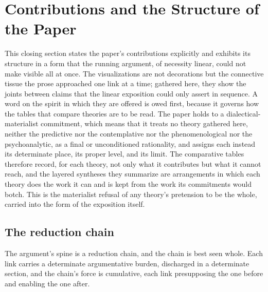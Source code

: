 \section{Contributions and the Structure of the Paper}
\label{p22:sec:contributions}

\noindent
This closing section states the paper's contributions explicitly and exhibits its structure in a form that the running argument, of necessity linear, could not make visible all at once. The visualizations are not decorations but the connective tissue the prose approached one link at a time; gathered here, they show the joints between claims that the linear exposition could only assert in sequence. A word on the spirit in which they are offered is owed first, because it governs how the tables that compare theories are to be read. The paper holds to a dialectical-materialist commitment, which means that it treats no theory gathered here, neither the predictive nor the contemplative nor the phenomenological nor the psychoanalytic, as a final or unconditioned rationality, and assigns each instead its determinate place, its proper level, and its limit. The comparative tables therefore record, for each theory, not only what it contributes but what it cannot reach, and the layered syntheses they summarize are arrangements in which each theory does the work it can and is kept from the work its commitments would botch. This is the materialist refusal of any theory's pretension to be the whole, carried into the form of the exposition itself.

\subsection{The reduction chain}
\label{p22:sub:contrib-chain}

The argument's spine is a reduction chain, and the chain is best seen whole. Each link carries a determinate argumentative burden, discharged in a determinate section, and the chain's force is cumulative, each link presupposing the one before and enabling the one after.

